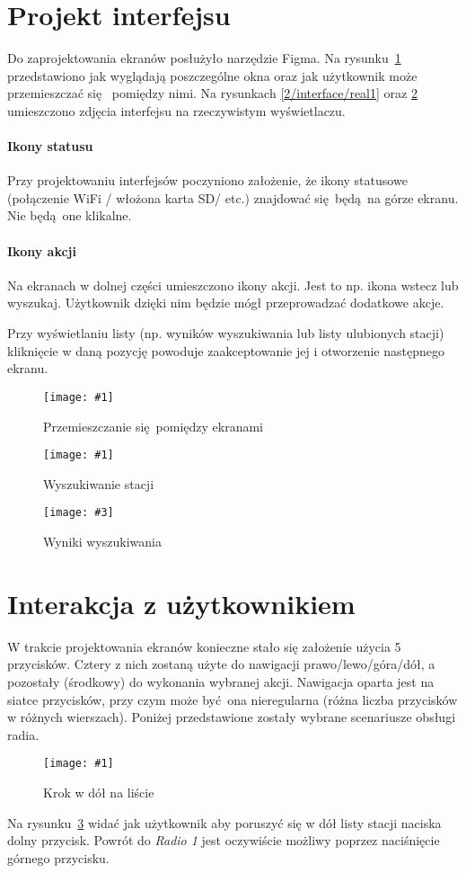 \documentclass[12pt]{report}
\newcommand{\imgcs}[3]{
	\begin{figure}
		\centering
		\texttt{[image: \#1]}
		\caption{#2}
		\label{#1}
	\end{figure}
}
\newcommand{\imgh}[3]{
	\begin{figure}[H]
		\centering
		\texttt{[image: \#1]}
		\caption{#2}
		\label{#1}
	\end{figure}
}
\newcommand{\imgss}[4]{
	\begin{figure}
		\centering
		\begin{minipage}{.45\textwidth}
			\centering
			\texttt{[image: \#1]}
			\caption{#2}
			\label{#1}
		\end{minipage}%
		\hfill
		\begin{minipage}{.45\textwidth}
			\centering
			\texttt{[image: \#3]}
			\caption{#4}
			\label{#3}
		\end{minipage}
	\end{figure}
}
\begin{document}
	\section{Projekt interfejsu}
		Do zaprojektowania ekranów posłużyło narzędzie Figma\textsuperscript{\cite{figma}}. Na rysunku~\ref{2/interface/all} przedstawiono jak wyglądają poszczególne okna oraz jak użytkownik może przemieszczać się  pomiędzy nimi. Na rysunkach \ref{2/interface/real1} oraz \ref{2/interface/real2} umieszczono zdjęcia interfejsu na rzeczywistym wyświetlaczu.
		
		\paragraph{Ikony statusu}
			Przy projektowaniu interfejsów poczyniono założenie, że ikony statusowe (połączenie WiFi  / włożona karta SD/ etc.) znajdować się będą na górze ekranu. Nie będą one klikalne.
			
		\paragraph{Ikony akcji}
			Na ekranach w dolnej części umieszczono ikony akcji. Jest to np. ikona wstecz lub wyszukaj. Użytkownik dzięki nim będzie mógł przeprowadzać dodatkowe akcje.
		
		$ $\\
		Przy wyświetlaniu listy (np. wyników wyszukiwania lub listy ulubionych stacji) kliknięcie w daną pozycję powoduje zaakceptowanie jej i otworzenie następnego ekranu.

		\imgcs{2/interface/all}{Przemieszczanie się pomiędzy ekranami}{0.9}
		\imgss{2/interface/real1}{Wyszukiwanie stacji}{2/interface/real2}{Wyniki wyszukiwania}
	
	\section{Interakcja z użytkownikiem}
		W trakcie projektowania ekranów konieczne stało się założenie użycia 5 przycisków. Cztery z nich zostaną użyte do nawigacji prawo/lewo/góra/dół, a pozostały (środkowy) do wykonania wybranej akcji. Nawigacja oparta jest na siatce przycisków, przy czym może być ona nieregularna (różna liczba przycisków w różnych wierszach). Poniżej przedstawione zostały wybrane scenariusze obsługi radia.
		
		\imgh{2/btn/1}{Krok w dół na liście}{0.7}
		Na rysunku~\ref{2/btn/1} widać jak użytkownik aby poruszyć się w dół listy stacji naciska dolny przycisk. Powrót do \textit{Radio 1} jest oczywiście możliwy poprzez naciśnięcie górnego przycisku.
		
\end{document}

